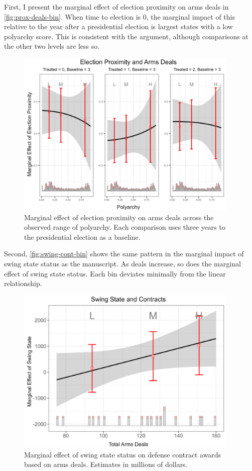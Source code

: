 \documentclass[12pt]{article}
\begin{document}
First, I present the marginal effect of election proximity on arms deals in \autoref{fig:prox-deals-bin}.
When time to election is 0, the marginal impact of this relative to the year after a presidential election is largest states with a low polyarchy score. 
This is consistent with the argument, although comparisons at the other two levels are less so. 



\begin{figure}[htpb]
	\centering
		\includegraphics[width=0.95\textwidth]{prox-deals-bin.png}
	\caption{Marginal effect of election proximity on arms deals across the observed range of polyarchy. Each comparison uses three years to the presidential election as a baseline.}
	\label{fig:prox-deals-bin}
\end{figure}


Second, \autoref{fig:swing-cont-bin} shows the same pattern in the marginal impact of swing state status as the manuscript. 
As deals increase, so does the marginal effect of swing state status. 
Each bin deviates minimally from the linear relationship. 


\begin{figure}[htpb]
	\centering
		\includegraphics[width=0.95\textwidth]{swing-cont-bin.png}
	\caption{Marginal effect of swing state status on defense contract awards based on arms deals. Estimates in millions of dollars.}
	\label{fig:swing-cont-bin}
\end{figure}
\end{document}
